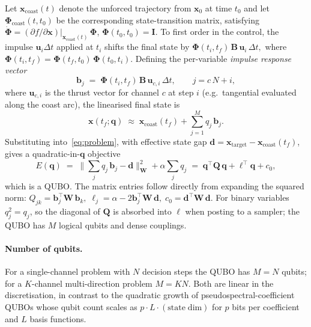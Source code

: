 \documentclass[11pt,a4paper]{article}
\theoremstyle{plain}
\newcommand{\bvec}[1]{\bm{#1}}
\newcommand{\xvec}{\bvec{x}}
\newcommand{\uvec}{\bvec{u}}
\newcommand{\qvec}{\bvec{q}}
\newcommand{\bbvec}{\bvec{b}}
\newcommand{\dvec}{\bvec{d}}
\newcommand{\Bmat}{\bvec{B}}
\newcommand{\Qmat}{\bvec{Q}}
\newcommand{\Wmat}{\bvec{W}}
\newcommand{\Iden}{\bvec{I}}
\newcommand{\Phimat}{\bvec{\Phi}}
\begin{document}
Let $\xvec_\mathrm{coast}(t)$ denote the unforced trajectory from
$\xvec_0$ at time $t_0$ and let
$\Phimat_\mathrm{coast}(t, t_0)$ be the corresponding state-transition
matrix, satisfying
$\dot{\Phimat} = (\partial f/\partial \xvec)\big|_{\xvec_\mathrm{coast}(t)}\,
\Phimat$, $\Phimat(t_0, t_0) = \Iden$. To first order in the
control, the impulse $\uvec_i \Delta t$ applied at $t_i$ shifts the
final state by
\(
  \Phimat(t_i, t_f)\,\Bmat\, \uvec_i\, \Delta t,
\)
where $\Phimat(t_i, t_f) =
\Phimat(t_f, t_0)\,\Phimat(t_0, t_i)$. Defining the per-variable
\emph{impulse response vector}
\begin{equation}\label{eq:b-vec}
  \bbvec_j \;=\; \Phimat(t_i, t_f)\, \Bmat\, \uvec_{c,i}\, \Delta t,
  \qquad j = c\, N + i,
\end{equation}
where $\uvec_{c,i}$ is the thrust vector for channel $c$ at step
$i$ (e.g.~tangential evaluated along the coast arc), the linearised
final state is
\begin{equation}\label{eq:lin-final}
  \xvec(t_f; \qvec)
  \;\approx\;
  \xvec_\mathrm{coast}(t_f) + \sum_{j=1}^{M} q_j\, \bbvec_j .
\end{equation}
Substituting into~\eqref{eq:problem}, with effective state gap
$\dvec = \xvec_\mathrm{target} - \xvec_\mathrm{coast}(t_f)$, gives a
quadratic-in-$\qvec$ objective
\begin{equation}\label{eq:qubo}
  E(\qvec) \;=\;
  \Bigg\| \sum_{j} q_j\, \bbvec_j - \dvec \Bigg\|_{\Wmat}^2
  + \alpha \sum_j q_j
  \;=\;
  \qvec^\top \Qmat\, \qvec + \bvec{\ell}^\top \qvec + c_0 ,
\end{equation}
which is a QUBO. The matrix entries follow directly from
expanding the squared norm:
\(
  Q_{jk} = \bbvec_j^\top \Wmat\, \bbvec_k,\;
  \ell_j = \alpha - 2\bbvec_j^\top \Wmat\, \dvec,\;
  c_0 = \dvec^\top \Wmat\, \dvec.
\)
For binary variables $q_j^2 = q_j$, so the diagonal of $\Qmat$ is
absorbed into $\bvec{\ell}$ when posting to a sampler; the QUBO has
$M$ logical qubits and dense couplings.

\paragraph{Number of qubits.} For a single-channel problem with
$N$ decision steps the QUBO has $M = N$ qubits; for a
$K$-channel multi-direction problem $M = K N$. Both are linear
in the discretisation, in contrast to the quadratic growth of
pseudospectral-coefficient QUBOs whose qubit count scales as
$p \cdot L \cdot \mathrm{(state\;dim)}$ for $p$ bits per
coefficient and $L$ basis functions.
\end{document}
